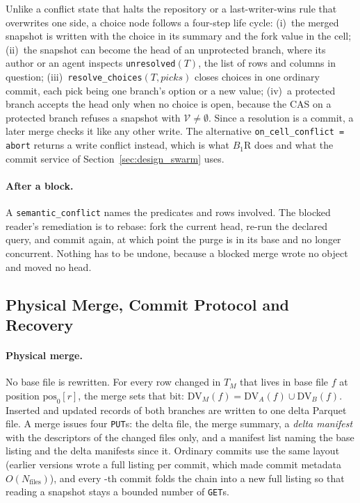 \documentclass[sigconf, nonacm]{acmart}
\begin{document}
Unlike a conflict state that halts the repository or a last-writer-wins rule that overwrites one side, a choice node follows a four-step life cycle: (i)~the merged snapshot is written with the choice in its summary and the fork value in the cell; (ii)~the snapshot can become the head of an unprotected branch, where its author or an agent inspects \texttt{unresolved}$(T)$, the list of rows and columns in question; (iii)~\texttt{resolve\_choices}$(T, \mathit{picks})$ closes choices in one ordinary commit, each pick being one branch's option or a new value; (iv)~a protected branch accepts the head only when no choice is open, because the CAS on a protected branch refuses a snapshot with $\mathcal{V} \neq \emptyset$. Since a resolution is a commit, a later merge checks it like any other write. The alternative \texttt{on\_cell\_conflict = abort} returns a write conflict instead, which is what $B_1\text{R}$ does and what the commit service of Section~\ref{sec:design_swarm} uses.

\paragraph{After a block.} A \texttt{semantic\_conflict} names the predicates and rows involved. The blocked reader's remediation is to rebase: fork the current head, re-run the declared query, and commit again, at which point the purge is in its base and no longer concurrent. Nothing has to be undone, because a blocked merge wrote no object and moved no head.

\subsection{Physical Merge, Commit Protocol and Recovery}
\label{sec:design_protocol}
\label{sec:design_physical}

\paragraph{Physical merge.} No base file is rewritten. For every row changed in $T_M$ that lives in base file $f$ at position $\text{pos}_0[r]$, the merge sets that bit: $\text{DV}_M(f) = \text{DV}_A(f) \cup \text{DV}_B(f)$. Inserted and updated records of both branches are written to one delta Parquet file. A merge issues four \texttt{PUT}s: the delta file, the merge summary, a \emph{delta manifest} with the descriptors of the changed files only, and a manifest list naming the base listing and the delta manifests since it. Ordinary commits use the same layout (earlier versions wrote a full listing per commit, which made commit metadata $O(N_{\text{files}})$), and every \ManifestCheckpoint-th commit folds the chain into a new full listing so that reading a snapshot stays a bounded number of \texttt{GET}s.
\end{document}
